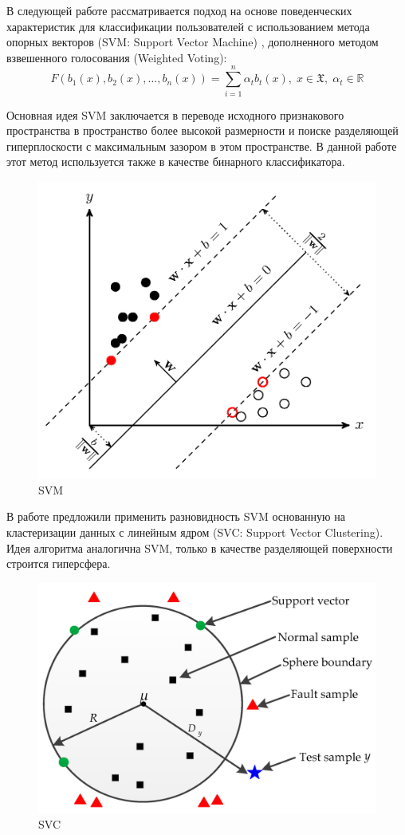 \documentclass[12pt]{article}
\begin{document}
    \par В следующей работе \cite{Khalifa} рассматривается подход на основе поведенческих характеристик для классификации пользователей с использованием метода опорных векторов (SVM: Support Vector Machine) \cite{SVM}, дополненного методом взвешенного голосования (Weighted Voting):
    \begin{equation}
    \label{sec:Overview:Model:formula:WeightedVoting}
        F(b_1(x), b_2(x),\ldots,b_n(x)) = \sum_{i=1}^{n} \alpha_t b_t(x), \; x \in \mathfrak{X}, \; \alpha_t \in \mathbb{R}
    \end{equation}
    
    \par Основная идея SVM заключается в переводе исходного признакового пространства в пространство более высокой размерности и поиске разделяющей гиперплоскости с максимальным зазором в этом пространстве. В данной работе этот метод используется также в качестве бинарного классификатора.

    \begin{figure}[h!]
        \centering
        \includegraphics[width=0.44\linewidth]{SVM.png}
        \caption{SVM}
        \label{sec:Overview:Model:fig:SVM}
    \end{figure}

    \par В работе \cite{Tan} предложили применить разновидность SVM основанную на кластеризации данных с линейным ядром (SVC: Support Vector Clustering). Идея алгоритма аналогична SVM, только в качестве разделяющей поверхности строится гиперсфера.

    \begin{figure}[h!]
        \centering
        \includegraphics[width=0.44\linewidth]{SVC.png}
        \caption{SVC}
        \label{sec:Overview:Model:fig:SVC}
    \end{figure}
\end{document}
